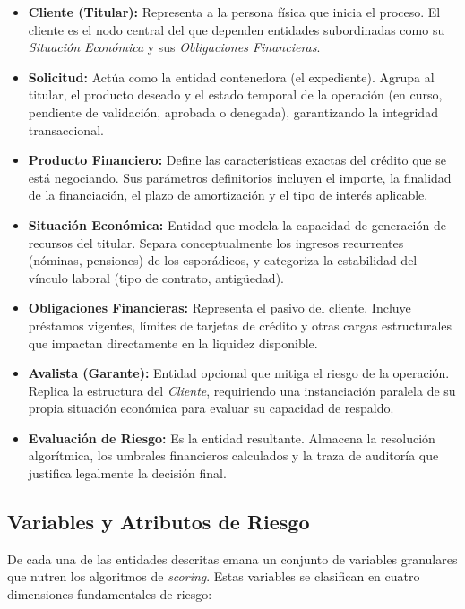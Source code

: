\documentclass[12pt,a4paper]{report}
\begin{document}
\begin{itemize}
    \item \textbf{Cliente (Titular):} Representa a la persona física que inicia el proceso. El cliente es el nodo central del que dependen entidades subordinadas como su \textit{Situación Económica} y sus \textit{Obligaciones Financieras}.
    \item \textbf{Solicitud:} Actúa como la entidad contenedora (el expediente). Agrupa al titular, el producto deseado y el estado temporal de la operación (en curso, pendiente de validación, aprobada o denegada), garantizando la integridad transaccional.
    \item \textbf{Producto Financiero:} Define las características exactas del crédito que se está negociando. Sus parámetros definitorios incluyen el importe, la finalidad de la financiación, el plazo de amortización y el tipo de interés aplicable.
    \item \textbf{Situación Económica:} Entidad que modela la capacidad de generación de recursos del titular. Separa conceptualmente los ingresos recurrentes (nóminas, pensiones) de los esporádicos, y categoriza la estabilidad del vínculo laboral (tipo de contrato, antigüedad).
    \item \textbf{Obligaciones Financieras:} Representa el pasivo del cliente. Incluye préstamos vigentes, límites de tarjetas de crédito y otras cargas estructurales que impactan directamente en la liquidez disponible.
    \item \textbf{Avalista (Garante):} Entidad opcional que mitiga el riesgo de la operación. Replica la estructura del \textit{Cliente}, requiriendo una instanciación paralela de su propia situación económica para evaluar su capacidad de respaldo.
    \item \textbf{Evaluación de Riesgo:} Es la entidad resultante. Almacena la resolución algorítmica, los umbrales financieros calculados y la traza de auditoría que justifica legalmente la decisión final.
\end{itemize}

\subsection{Variables y Atributos de Riesgo}

De cada una de las entidades descritas emana un conjunto de variables granulares que nutren los algoritmos de \textit{scoring}. Estas variables se clasifican en cuatro dimensiones fundamentales de riesgo:
\end{document}
